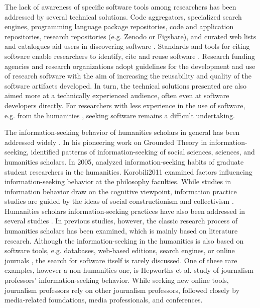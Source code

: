 \documentclass[12pt, a4paper, titlepage, oneside, abstract=true, toc=listof, toc=bibliography, BCOR=1cm]{scrreprt}
\begin{document}
The lack of awareness of specific software tools among researchers has been addressed by several technical solutions. Code aggregators, specialized search engines, programming language package repositories, code and application repositories, research repositories (e.g. Zenodo or Figshare), and curated web lists and catalogues aid users in discovering software \citep{Struck2018}. Standards and tools for citing software enable researchers to identify, cite and reuse software \citep[e.g.][]{Niemeyer2016, Smith2016, Soito2017}. Research funding agencies and research organizations \citep[e.g.][]{Haupt2018, Katerbow2018, Scheliga2019} adopt guidelines for the development and use of research software with the aim of increasing the reusability and quality of the software artifacts developed. In turn, the technical solutions presented are also aimed more at a technically experienced audience, often even at software developers directly. For researchers with less experience in the use of software, e.g. from the humanities \citep{Rimmer2006}, seeking software remains a difficult undertaking.

The information-seeking behavior of humanities scholars in general has been addressed widely \citep[e.g.][]{Barrett2005, Bronstein2007, Bronstein2007a, Catalano2013, Ellis1993, Given2018, Korobili2011, Liew2006, Rimmer2006}. In his pioneering work on Grounded Theory in information-seeking, \citet{Ellis1993} identified patterns of information-seeking of social sciences, sciences, and humanities scholars. In 2005, \citet{Barrett2005} analyzed information-seeking habits of graduate student researchers in the humanities. Korobili{2011} examined factors influencing information-seeking behavior at the philosophy faculties. While studies in information behavior draw on the cognitive viewpoint, information practice studies are guided by the ideas of social constructionism and collectivism \citep{Savolainen2007, Talja2005, Talja2007}. Humanities scholars information-seeking practices have also been addressed in several studies \citep{Benardou2013, Bulger2011, Given2018, Palmer2009}. In previous studies, however, the classic research process of humanities scholars has been examined, which is mainly based on literature research. Although the information-seeking in the humanities is also based on software tools, e.g. databases, web-based editions, search engines, or online journals \citep{Barrett2005, Rimmer2006}, the search for software itself is rarely discussed. One of these rare examples, however a non-humanities one, is Hepworths et al. \citeyearpar{Hepworth2017} study of journalism professors' information-seeking behavior. While seeking new online tools, journalism professors rely on other journalism professors, followed closely by media-related foundations, media professionals, and conferences.
\end{document}

